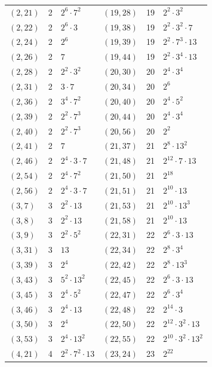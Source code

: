 \documentclass[11pt]{article}
\begin{document}
\begin{longtable}{@{}lrl@{\qquad}lrl@{}}
$(2,21)$ & 2 & $2^{6}\cdot 7^{2}$ & $(19,28)$ & 19 & $2^{2}\cdot 3^{2}$\\
$(2,22)$ & 2 & $2^{6}\cdot 3$ & $(19,38)$ & 19 & $2^{2}\cdot 3^{2}\cdot 7$\\
$(2,24)$ & 2 & $2^{6}$ & $(19,39)$ & 19 & $2^{2}\cdot 7^{3}\cdot 13$\\
$(2,26)$ & 2 & $7$ & $(19,44)$ & 19 & $2^{2}\cdot 3^{4}\cdot 13$\\
$(2,28)$ & 2 & $2^{2}\cdot 3^{2}$ & $(20,30)$ & 20 & $2^{4}\cdot 3^{4}$\\
$(2,31)$ & 2 & $3\cdot 7$ & $(20,34)$ & 20 & $2^{6}$\\
$(2,36)$ & 2 & $3^{4}\cdot 7^{2}$ & $(20,40)$ & 20 & $2^{4}\cdot 5^{2}$\\
$(2,39)$ & 2 & $2^{2}\cdot 7^{3}$ & $(20,44)$ & 20 & $2^{4}\cdot 3^{4}$\\
$(2,40)$ & 2 & $2^{2}\cdot 7^{3}$ & $(20,56)$ & 20 & $2^{2}$\\
$(2,41)$ & 2 & $7$ & $(21,37)$ & 21 & $2^{8}\cdot 13^{2}$\\
$(2,46)$ & 2 & $2^{4}\cdot 3\cdot 7$ & $(21,48)$ & 21 & $2^{12}\cdot 7\cdot 13$\\
$(2,54)$ & 2 & $2^{4}\cdot 7^{2}$ & $(21,50)$ & 21 & $2^{18}$\\
$(2,56)$ & 2 & $2^{4}\cdot 3\cdot 7$ & $(21,51)$ & 21 & $2^{10}\cdot 13$\\
$(3,7)$ & 3 & $2^{2}\cdot 13$ & $(21,53)$ & 21 & $2^{10}\cdot 13^{3}$\\
$(3,8)$ & 3 & $2^{2}\cdot 13$ & $(21,58)$ & 21 & $2^{10}\cdot 13$\\
$(3,9)$ & 3 & $2^{2}\cdot 5^{2}$ & $(22,31)$ & 22 & $2^{6}\cdot 3\cdot 13$\\
$(3,31)$ & 3 & $13$ & $(22,34)$ & 22 & $2^{8}\cdot 3^{4}$\\
$(3,39)$ & 3 & $2^{4}$ & $(22,42)$ & 22 & $2^{8}\cdot 13^{3}$\\
$(3,43)$ & 3 & $5^{2}\cdot 13^{2}$ & $(22,45)$ & 22 & $2^{6}\cdot 3\cdot 13$\\
$(3,45)$ & 3 & $2^{4}\cdot 5^{2}$ & $(22,47)$ & 22 & $2^{6}\cdot 3^{4}$\\
$(3,46)$ & 3 & $2^{4}\cdot 13$ & $(22,48)$ & 22 & $2^{14}\cdot 3$\\
$(3,50)$ & 3 & $2^{4}$ & $(22,50)$ & 22 & $2^{12}\cdot 3^{2}\cdot 13$\\
$(3,53)$ & 3 & $2^{4}\cdot 13^{2}$ & $(22,55)$ & 22 & $2^{10}\cdot 3^{2}\cdot 13^{2}$\\
$(4,21)$ & 4 & $2^{2}\cdot 7^{2}\cdot 13$ & $(23,24)$ & 23 & $2^{22}$\\

\end{longtable}
\end{document}

